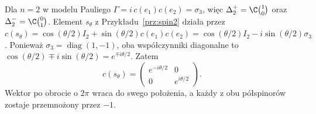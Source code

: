\begin{przyklad}
Dla $n=2$ w modelu Pauliego
$\Gamma=i\,c(e_1)c(e_2)=\sigma_3$,
więc $\Delta^+_2=\C\binom10$ oraz
$\Delta^-_2=\C\binom01$.
Element $s_\theta$ z Przykładu~\ref{prz:spin2}
działa przez
$c(s_\theta)=\cos(\theta/2)I_2
+\sin(\theta/2)c(e_1)c(e_2)
=\cos(\theta/2)I_2-i\sin(\theta/2)\sigma_3$.
Ponieważ $\sigma_3=\operatorname{diag}(1,-1)$,
oba współczynniki diagonalne to
$\cos(\theta/2)\mp i\sin(\theta/2)=e^{\mp i\theta/2}$.
Zatem
\[
 c(s_\theta)=
 \begin{pmatrix}
  e^{-i\theta/2}&0\\0&e^{i\theta/2}
 \end{pmatrix}.
\]
Wektor po obrocie o $2\pi$ wraca do swego
położenia, a każdy z obu półspinorów
zostaje przemnożony przez $-1$.
\end{przyklad}

